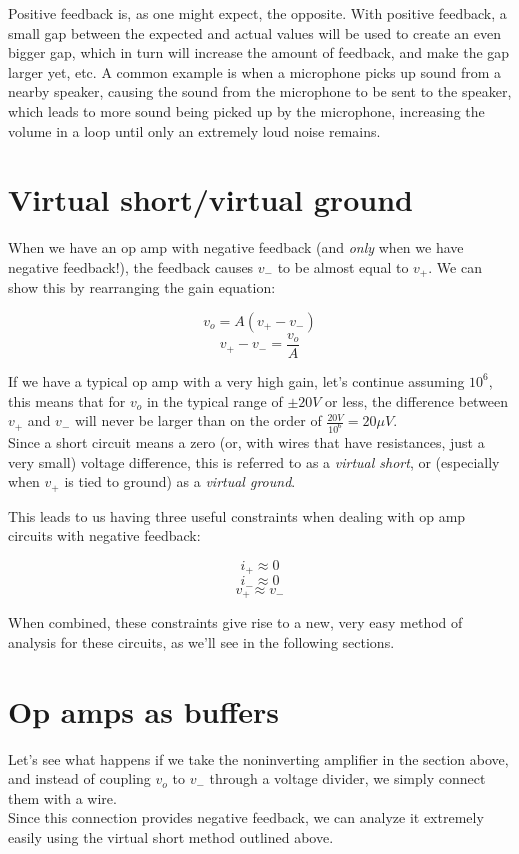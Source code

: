 \documentclass[12pt,a4paper]{report}
\begin{document}
Positive feedback is, as one might expect, the opposite. With positive feedback, a small gap between the expected and actual values will be used to create an even bigger gap, which in turn will increase the amount of feedback, and make the gap larger yet, etc. A common example is when a microphone picks up sound from a nearby speaker, causing the sound from the microphone to be sent to the speaker, which leads to more sound being picked up by the microphone, increasing the volume in a loop until only an extremely loud noise remains.

\section{Virtual short/virtual ground}

When we have an op amp with negative feedback (and \emph{only} when we have negative feedback!), the feedback causes $v_-$ to be almost equal to $v_+$. We can show this by rearranging the gain equation:

\[ v_o = A(v_+ - v_-) \]
\[ v_+ - v_- = \frac{v_o}{A} \]

If we have a typical op amp with a very high gain, let's continue assuming $10^6$, this means that for $v_o$ in the typical range of $\pm 20V$ or less, the difference between $v_+$ and $v_-$ will never be larger than on the order of $\displaystyle \frac{20V}{10^6} = 20 \mu V$.\\
Since a short circuit means a zero (or, with wires that have resistances, just a very small) voltage difference, this is referred to as a \emph{virtual short}, or (especially when $v_+$ is tied to ground) as a \emph{virtual ground}.

This leads to us having three useful constraints when dealing with op amp circuits with negative feedback:

\[ i_+ \approx 0 \]
\[ i_- \approx 0 \]
\[ v_+ \approx v_- \]

When combined, these constraints give rise to a new, very easy method of analysis for these circuits, as we'll see in the following sections.

\newpage

\section{Op amps as buffers}

Let's see what happens if we take the noninverting amplifier in the section above, and instead of coupling $v_o$ to $v_-$ through a voltage divider, we simply connect them with a wire.\\
Since this connection provides negative feedback, we can analyze it extremely easily using the virtual short method outlined above.\\
\end{document}
